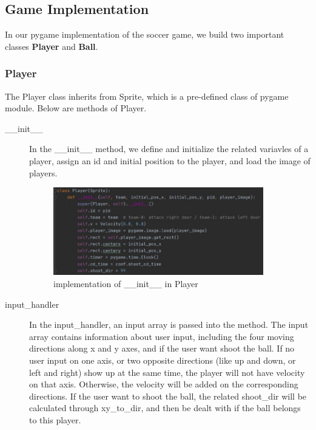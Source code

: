 \documentclass[14pt]{extarticle}
\begin{document}
\subsection{Game Implementation}

In our pygame implementation of the soccer game, we build two important classes \textbf{Player} and \textbf{Ball}.

\subsubsection{Player}
The Player class inherits from Sprite, which is a pre-defined class of pygame module. Below are methods of Player.
\begin{description}
	\item[\_\_init\_\_]
	In the \_\_init\_\_ method, we define and initialize the related variavles of a player, assign an id and initial position to the player, and load the image of players.
	\begin{figure}[H]
		\begin{center}
			\includegraphics[width=0.9\textwidth]{Player_init}
			\caption{implementation of \_\_init\_\_ in Player}
		\end{center}
	\end{figure}
	\item[input\_handler]
	In the input\_handler, an input array is passed into the method. The input array contains information about user input, including the four moving directions along x and y axes, and if the user want shoot the ball. If no user input on one axis, or two opposite directions (like up and down, or left and right) show up at the same time, the player will not have velocity on that axis. Otherwise, the velocity will be added on the corresponding directions. If the user want to shoot the ball, the related shoot\_dir will be calculated through xy\_to\_dir, and then be dealt with if the ball belongs to this player.
	\begin{figure}[H]
		\begin{center}

\end{center}
\end{figure}
\end{description}
\end{document}
